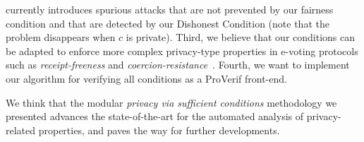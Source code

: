 currently introduces spurious attacks that are not prevented by our fairness condition
and that are detected by our Dishonest Condition (note that the problem disappears
when $c$ is private).
Third, we believe that our conditions can be adapted to enforce more complex privacy-type 
properties in e-voting protocols such as {\em receipt-freeness} and {\em coercion-resistance}~\cite{DKR-jcs09,vote-CSF08-maffei}.
Fourth, we want to implement our algorithm for verifying all conditions as a ProVerif front-end.


We think that the modular {\em privacy via sufficient conditions}
methodology we presented advances the state-of-the-art for
the automated analysis of privacy-related properties, and paves the way for
further developments.


